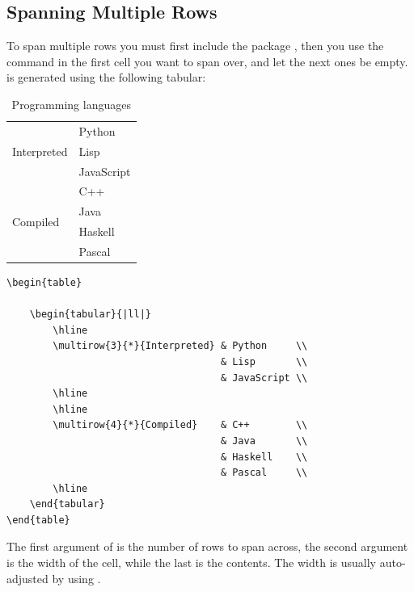 {\subsection{Spanning Multiple Rows}
To span multiple rows you must first include the package , then you use the command \latexin{\multirows} in the first cell you want to span over, and let the next ones be empty.  is generated using the following tabular:

\begin{table}
	\centering
	\caption{Programming languages}
	\begin{tabular}{|ll|}
		\hline
		\multirow{3}{*}{Interpreted}		& Python		\\
										& Lisp		\\
										& JavaScript	\\
		\hline
		\hline
		\multirow{4}{*}{Compiled}		& C++		\\
										& Java		\\
										& Haskell	\\
										& Pascal		\\
		\hline
	\end{tabular}
	\label{tab:latex:languages}
\end{table}

\begin{verbatim}
\begin{table}

	\begin{tabular}{|ll|}
		\hline
		\multirow{3}{*}{Interpreted} & Python     \\
		                             & Lisp       \\
		                             & JavaScript \\
		\hline
		\hline
		\multirow{4}{*}{Compiled}    & C++        \\
		                             & Java       \\
		                             & Haskell    \\
		                             & Pascal     \\
		\hline
	\end{tabular}
\end{table}
\end{verbatim}

The first argument of \latexin{\multirow} is the number of rows to span across, the second argument is the width of the cell, while the last is the contents. The width is usually auto-adjusted by using \latexin{*}.

}
